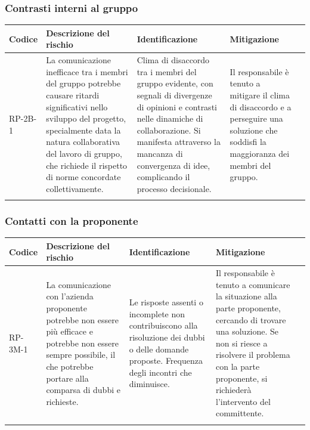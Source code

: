 \documentclass{article}
\begin{document}
\newpage
\subsubsection{Contrasti interni al gruppo}
\begin{table}[h]
    \centering
    \begin{tabularx}{\textwidth}{l>{\RaggedRight}X>{\RaggedRight}X>{\RaggedRight}X>{\RaggedRight}X}
    \toprule
    \rowcolor{gray!50}
    \textbf{Codice} & \textbf{Descrizione del rischio} & \textbf{Identificazione} & \textbf{Mitigazione} \\
    \midrule
    \addlinespace 
    RP-2B-1 & 
    La comunicazione inefficace tra i membri del gruppo potrebbe causare ritardi significativi nello sviluppo del progetto, specialmente data la natura collaborativa del lavoro di gruppo, che richiede il rispetto di norme concordate collettivamente.& 
    Clima di disaccordo tra i membri del gruppo evidente, con segnali di divergenze di opinioni e contrasti nelle dinamiche di collaborazione. Si manifesta attraverso la mancanza di convergenza di idee, complicando il processo decisionale. &
    Il responsabile è tenuto a mitigare il clima di disaccordo e a perseguire una soluzione che soddisfi la maggioranza dei membri del gruppo. \\
    \bottomrule
    \addlinespace 
    \end{tabularx}
\end{table}

\subsubsection{Contatti con la proponente}
\begin{table}[h]
    \centering
    \begin{tabularx}{\textwidth}{l>{\RaggedRight}X>{\RaggedRight}X>{\RaggedRight}X>{\RaggedRight}X}
    \toprule
    \rowcolor{gray!50}
    \textbf{Codice} & \textbf{Descrizione del rischio} & \textbf{Identificazione} & \textbf{Mitigazione} \\
    \midrule
    \addlinespace 
    RP-3M-1 & 
    La comunicazione con l'azienda proponente potrebbe non essere più efficace e potrebbe non essere sempre possibile, il che potrebbe portare alla comparsa di dubbi e richieste. & 
    Le risposte assenti o incomplete non contribuiscono alla risoluzione dei dubbi o delle domande proposte. Frequenza degli incontri che diminuisce.&
    Il responsabile è tenuto a comunicare la situazione alla parte proponente, cercando di trovare una soluzione. Se non si riesce a risolvere il problema con la parte proponente, si richiederà l’intervento del committente. \\
    \bottomrule
    \addlinespace 
    \end{tabularx}
\end{table}
\end{document}
